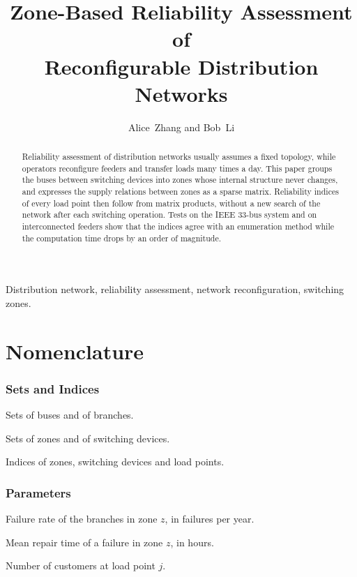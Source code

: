 \documentclass[journal]{IEEEtran}
\begin{document}
\title{Zone-Based Reliability Assessment of\\ Reconfigurable Distribution Networks}
\author{Alice~Zhang and Bob~Li}
\maketitle

\begin{abstract}
Reliability assessment of distribution networks usually assumes a fixed topology, while
operators reconfigure feeders and transfer loads many times a day. This paper groups the
buses between switching devices into zones whose internal structure never changes, and
expresses the supply relations between zones as a sparse matrix. Reliability indices of every
load point then follow from matrix products, without a new search of the network after each
switching operation. Tests on the IEEE 33-bus system and on interconnected feeders show that the
indices agree with an enumeration method while the computation time drops by an order of
magnitude.
\end{abstract}

\begin{IEEEkeywords}
Distribution network, reliability assessment, network reconfiguration, switching zones.
\end{IEEEkeywords}

\section*{Nomenclature}

\subsubsection*{Sets and Indices}
\begin{IEEEdescription}
\item[$\mathcal{N},\mathcal{L}$] Sets of buses and of branches.
\item[$\mathcal{Z},\mathcal{K}$] Sets of zones and of switching devices.
\item[$z,k,j$] Indices of zones, switching devices and load points.
\end{IEEEdescription}

\subsubsection*{Parameters}
\begin{IEEEdescription}
\item[$\lambda_z$] Failure rate of the branches in zone $z$, in failures per year.
\item[$r_z$] Mean repair time of a failure in zone $z$, in hours.
\item[$N_j$] Number of customers at load point $j$.
\end{IEEEdescription}
\end{document}
